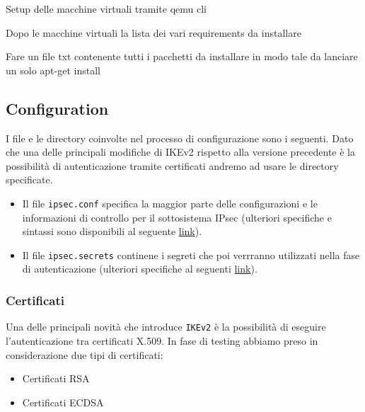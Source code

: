 \documentclass[
10pt, %
a4paper, %
oneside, %
headinclude,footinclude, %
BCOR5mm, %
]{scrartcl}
\begin{document}
Setup delle macchine virtuali tramite qemu cli


Dopo le macchine virtuali la lista dei vari requirements da installare


Fare un file txt contenente tutti i pacchetti da installare in modo tale da lanciare un solo apt-get install



\subsection{Configuration} 

I file e le directory coinvolte nel processo di configurazione sono i seguenti. Dato che una delle principali modifiche di IKEv2 
rispetto alla versione precedente è la possibilità di autenticazione tramite certificati andremo ad usare le directory specificate.
\\

    
\begin{itemize}
    \item Il file \lstinline|ipsec.conf| specifica la maggior parte delle configurazioni e le informazioni di controllo per il sottosistema IPsec (ulteriori specifiche e sintassi sono disponibili al seguente \href{https://linux.die.net/man/5/ipsec.conf}{link}).
    \item Il file \lstinline|ipsec.secrets| continene i segreti che poi verrranno utilizzati nella fase di autenticazione (ulteriori specifiche al seguenti \href{https://linux.die.net/man/5/ipsec.secrets}{link}).
\end{itemize}

\subsubsection*{Certificati}

Una delle principali novità che introduce \lstinline|IKEv2| è la possibilità di eseguire l'autenticazione tra certificati X.509. In fase di testing abbiamo preso in considerazione due tipi di certificati:

\begin{itemize}
    \item Certificati RSA
    \item Certificati ECDSA
\end{itemize}
\end{document}
